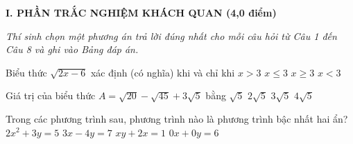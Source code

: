 
\noindent\textbf{\large I. PHẦN TRẮC NGHIỆM KHÁCH QUAN (4,0 điểm)}

\textit{Thí sinh chọn một phương án trả lời đúng nhất cho mỗi câu hỏi từ Câu 1 đến Câu 8 và ghi vào Bảng đáp án.}


\begin{ex}
Biểu thức $\sqrt{2x - 6}$ xác định (có nghĩa) khi và chỉ khi
\choice
{$x > 3$}
{$x \le 3$}
{\True $x \ge 3$}
{$x < 3$}
\end{ex}

\begin{ex}
Giá trị của biểu thức $A = \sqrt{20} - \sqrt{45} + 3\sqrt{5}$ bằng
\choice
{$\sqrt{5}$}
{\True $2\sqrt{5}$}
{$3\sqrt{5}$}
{$4\sqrt{5}$}
\end{ex}

\begin{ex}
Trong các phương trình sau, phương trình nào là phương trình bậc nhất hai ẩn?
\choice
{$2x^2 + 3y = 5$}
{\True $3x - 4y = 7$}
{$xy + 2x = 1$}
{$0x + 0y = 6$}
\end{ex}

